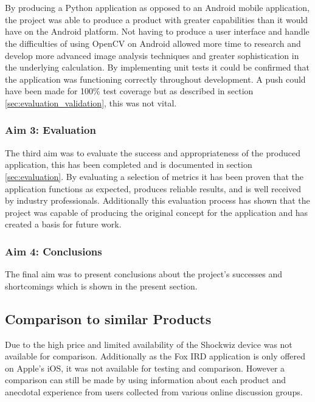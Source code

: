 			\\\\
			By producing a Python application as opposed to an Android mobile application, the project was able to produce a product with greater capabilities than it would have on the Android platform. Not having to produce a user interface and handle the difficulties of using OpenCV on Android allowed more time to research and develop more advanced image analysis techniques and greater sophistication in the underlying calculation. By implementing unit tests it could be confirmed that the application was functioning correctly throughout development. A push could have been made for 100\% test coverage but as described in section \ref{sec:evaluation_validation}, this was not vital.
		\subsubsection{Aim 3: Evaluation}
			The third aim was to evaluate the success and appropriateness of the produced application, this has been completed and is documented in section \ref{sec:evaluation}. By evaluating a selection of metrics it has been proven that the application functions as expected, produces reliable results, and is well received by industry professionals. Additionally this evaluation process has shown that the project was capable of producing the original concept for the application and has created a basis for future work.
		\subsubsection{Aim 4: Conclusions}
			The final aim was to present conclusions about the project's successes and shortcomings which is shown in the present section.
	\subsection{Comparison to similar Products}
		Due to the high price and limited availability of the Shockwiz device was not available for comparison. Additionally as the Fox IRD application is only offered on Apple's iOS, it was not available for testing and comparison. However a comparison can still be made by using information about each product and anecdotal experience from users collected from various online discussion groups.
